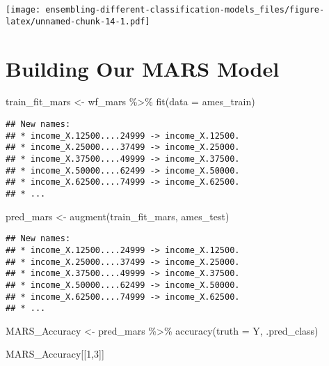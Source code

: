 \documentclass[
]{article}
\newenvironment{Shaded}{\begin{snugshade}}{\end{snugshade}}
\newcommand{\AttributeTok}[1]{\textcolor[rgb]{0.77,0.63,0.00}{#1}}
\newcommand{\DecValTok}[1]{\textcolor[rgb]{0.00,0.00,0.81}{#1}}
\newcommand{\FunctionTok}[1]{\textcolor[rgb]{0.00,0.00,0.00}{#1}}
\newcommand{\NormalTok}[1]{#1}
\newcommand{\OtherTok}[1]{\textcolor[rgb]{0.56,0.35,0.01}{#1}}
\newcommand{\SpecialCharTok}[1]{\textcolor[rgb]{0.00,0.00,0.00}{#1}}
\begin{document}
\texttt{[image: ensembling-different-classification-models\_files/figure-latex/unnamed-chunk-14-1.pdf]}


\hypertarget{building-our-mars-model}{%
\section{Building Our MARS Model}\label{building-our-mars-model}}

\begin{Shaded}
\begin{Highlighting}[]
\NormalTok{train\_fit\_mars }\OtherTok{\textless{}{-}} 
\NormalTok{  wf\_mars }\SpecialCharTok{\%\textgreater{}\%} 
  \FunctionTok{fit}\NormalTok{(}\AttributeTok{data =}\NormalTok{ ames\_train)}
\end{Highlighting}
\end{Shaded}

\begin{verbatim}
## New names:
## * income_X.12500....24999 -> income_X.12500.
## * income_X.25000....37499 -> income_X.25000.
## * income_X.37500....49999 -> income_X.37500.
## * income_X.50000....62499 -> income_X.50000.
## * income_X.62500....74999 -> income_X.62500.
## * ...
\end{verbatim}

\begin{Shaded}
\begin{Highlighting}[]
\NormalTok{pred\_mars }\OtherTok{\textless{}{-}} \FunctionTok{augment}\NormalTok{(train\_fit\_mars, ames\_test)}
\end{Highlighting}
\end{Shaded}

\begin{verbatim}
## New names:
## * income_X.12500....24999 -> income_X.12500.
## * income_X.25000....37499 -> income_X.25000.
## * income_X.37500....49999 -> income_X.37500.
## * income_X.50000....62499 -> income_X.50000.
## * income_X.62500....74999 -> income_X.62500.
## * ...
\end{verbatim}

\begin{Shaded}
\begin{Highlighting}[]
\NormalTok{MARS\_Accuracy }\OtherTok{\textless{}{-}}\NormalTok{ pred\_mars }\SpecialCharTok{\%\textgreater{}\%} 
  \FunctionTok{accuracy}\NormalTok{(}\AttributeTok{truth =}\NormalTok{ Y, .pred\_class)}

\NormalTok{MARS\_Accuracy[[}\DecValTok{1}\NormalTok{,}\DecValTok{3}\NormalTok{]]}
\end{Highlighting}
\end{Shaded}
\end{document}
